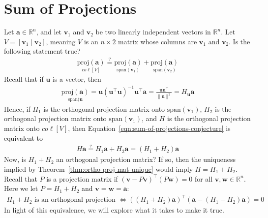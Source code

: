 \documentclass[12pt, a4paper]{article}
\theoremstyle{definition}
\begin{document}
	\section*{Sum of Projections}
	Let $\mathbf{a}\in \mathbb{R}^n$, and let $\mathbf{v}_1$ and $\mathbf{v}_2$ be
	two linearly independent vectors in $\mathbb{R}^n$. Let $V=[\mathbf{v}_1 \mid \mathbf{v}_2]$,
	meaning $V$ is an $n\times 2$ matrix whose columns are $\mathbf{v}_1$ and $\mathbf{v}_2$.
	Is the following statement true?
	\begin{align}
		\underset{co\ell [V]}{\text{proj}(\mathbf{a})}
		\stackrel{?}{=}\underset{\text{span}(\mathbf{v}_1) }{\text{proj}(\mathbf{a})}
		+\underset{\text{span}(\mathbf{v}_2) }{\text{proj}(\mathbf{a})}
		\label{eqn:sum-of-projections-conjecture}
	\end{align}
	Recall that if $\mathbf{u}$ is a vector, then
	\begin{align*}
		\underset{\text{span}(\mathbf{u} }{\text{proj}(\mathbf{a})} =
		\mathbf{u}(\mathbf{u}^\top \mathbf{u})^{-1}\mathbf{u}^\top \mathbf{a}
		=\frac{\mathbf{u}\mathbf{u}^\top}{\|\mathbf{u}\|^2} = H_{\mathbf{u}}\mathbf{a}
	\end{align*}
	Hence, if $H_1$ is the orthogonal projection matrix onto $\text{span}(\mathbf{v}_1)$,
	$H_2$ is the orthogonal projection matrix onto $\text{span}(\mathbf{v}_1)$, and
	$H$ is the orthogonal projection matrix onto $co\ell[V]$, then
	Equation~\ref{eqn:sum-of-projections-conjecture} is equivalent to
	\begin{align*}
		H\mathbf{a} \stackrel{?}{=} H_1\mathbf{a} + H_2\mathbf{a}=(H_1+H_2)\mathbf{a}
	\end{align*}
	Now, is $H_1+H_2$ an orthogonal projection matrix? If so, then the uniqueness
	implied by Theorem~\ref{thm:ortho-proj-mat-unique} would imply $H=H_1+H_2$.
	Recall that $P$ is a projection matrix if $(\mathbf{v}-P\mathbf{v})^\top(P\mathbf{w})=0$
	for all $\mathbf{v},\mathbf{w}\in\mathbb{R}^n$. Here we let $P=H_1+H_2$ and
	$\mathbf{v}=\mathbf{w}=\mathbf{a}$:
	\begin{align*}
		H_1+H_2\text{ is an orthogonal projection }
		\iff ( (H_1+H_2)\mathbf{a} )^\top(\mathbf{a} - (H_1+H_2)\mathbf{a})=0
	\end{align*}
	In light of this equivalence, we will explore what it takes to make it true.
\end{document}
